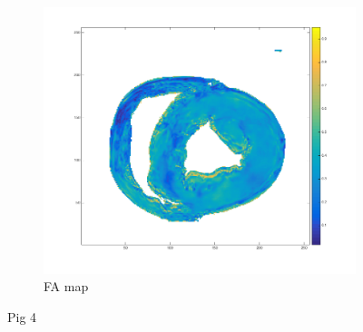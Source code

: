\begin{figure}[h!]
\begin{subfigure}{.31\textwidth}
        \includegraphics[width=\textwidth]{figures/pig4_fa_21}
        \caption{FA map}
        \label{fig:pig4_fa}
    \end{subfigure}
    \caption{Pig 4}
    \label{fig:pig4}
    

\end{figure}
